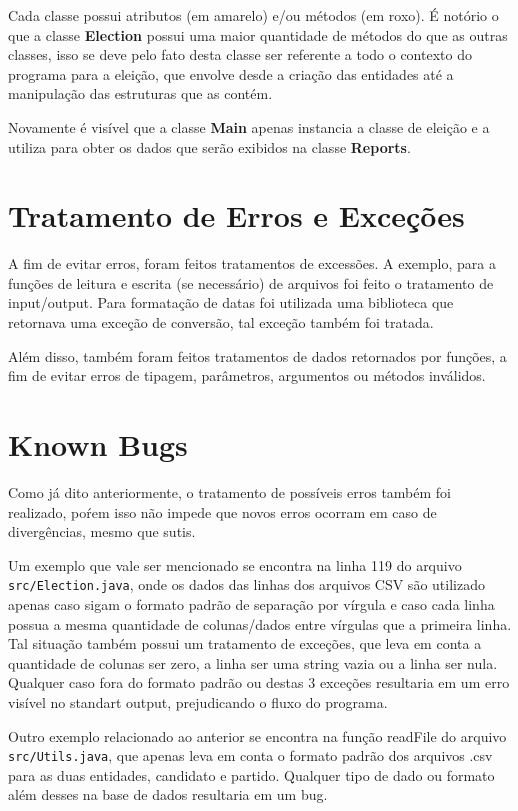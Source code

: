 \documentclass[
		12pt, %
		oneside, %
		a4paper, %
		article, %
		chapter=TITLE, %
		section=TITLE, %
		subsection=TITLE, %
		english, %
		spanish, %
		brazil %
]{abntex2} %
\numberwithin{equation}{section}
\numberwithin{figure}{section}
\numberwithin{table}{section}
\begin{document}
        Cada classe possui atributos (em amarelo) e/ou métodos (em roxo). É notório o que a classe \textbf{Election} possui uma maior quantidade de métodos do que as outras classes, isso se deve pelo fato desta classe ser referente a todo o contexto do programa para a eleição, que envolve desde a criação das entidades até a manipulação das estruturas que as contém.

        Novamente é visível que a classe \textbf{Main} apenas instancia a classe de eleição e a utiliza para obter os dados que serão exibidos na classe \textbf{Reports}.

    \newpage

	\section{Tratamento de Erros e Exceções}

        A fim de evitar erros, foram feitos tratamentos de excessões. A exemplo, para a funções de leitura e escrita (se necessário) de arquivos foi feito o tratamento de input/output. Para formatação de datas foi utilizada uma biblioteca que retornava uma exceção de conversão, tal exceção também foi tratada.

        Além disso, também foram feitos tratamentos de dados retornados por funções, a fim de evitar erros de tipagem, parâmetros, argumentos ou métodos inválidos.


	\section{Known Bugs}

        Como já dito anteriormente, o tratamento de possíveis erros também foi realizado, poŕem isso não impede que novos erros ocorram em caso de divergências, mesmo que sutis.

        Um exemplo que vale ser mencionado se encontra na linha 119 do arquivo \verb|src/Election.java|, onde os dados das linhas dos arquivos CSV são utilizado apenas caso sigam o formato padrão de separação por vírgula e caso cada linha possua a mesma quantidade de colunas/dados entre vírgulas que a primeira linha. Tal situação também possui um tratamento de exceções, que leva em conta a quantidade de colunas ser zero, a linha ser uma string vazia ou a linha ser nula. Qualquer caso fora do formato padrão ou destas 3 exceções resultaria em um erro visível no standart output, prejudicando o fluxo do programa.

        Outro exemplo relacionado ao anterior se encontra na função readFile do arquivo \verb|src/Utils.java|, que apenas leva em conta o formato padrão dos arquivos .csv para as duas entidades, candidato e partido. Qualquer tipo de dado ou formato além desses na base de dados resultaria em um bug.
\end{document}
